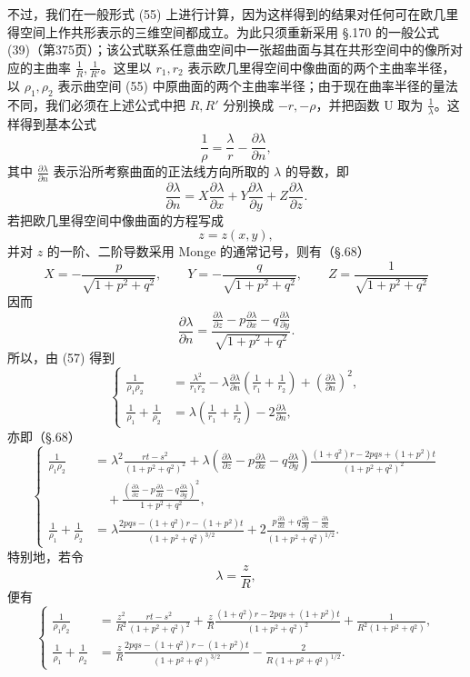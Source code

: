 不过，我们在一般形式 (55) 上进行计算，因为这样得到的结果对任何可在欧几里得空间上作共形表示的三维空间都成立。为此只须重新采用 \S.170 的一般公式 (39)（第375页）；该公式联系任意曲空间中一张超曲面与其在共形空间中的像所对应的主曲率 $\frac1R,\frac1{R'}$。这里以 $r_1,r_2$ 表示欧几里得空间中像曲面的两个主曲率半径，以 $\rho_1,\rho_2$ 表示曲空间 (55) 中原曲面的两个主曲率半径；由于现在曲率半径的量法不同，我们必须在上述公式中把 $R,R'$ 分别换成 $-r,-\rho$，并把函数 U 取为 $\frac1\lambda$。这样得到基本公式
\[
\tag{57}
\frac1\rho=\frac{\lambda}{r}-\frac{\partial\lambda}{\partial n},
\]
其中 $\frac{\partial\lambda}{\partial n}$ 表示沿所考察曲面的正法线方向所取的 $\lambda$ 的导数，即
\[
\frac{\partial\lambda}{\partial n}=X\frac{\partial\lambda}{\partial x}+Y\frac{\partial\lambda}{\partial y}+Z\frac{\partial\lambda}{\partial z}.
\]
若把欧几里得空间中像曲面的方程写成
\[
z=z(x,y),
\]
并对 $z$ 的一阶、二阶导数采用 Monge 的通常记号，则有（\S.68）
\[
X=-\frac{p}{\sqrt{1+p^2+q^2}},\qquad
Y=-\frac{q}{\sqrt{1+p^2+q^2}},\qquad
Z=\frac1{\sqrt{1+p^2+q^2}}
\]
因而
\[
\frac{\partial\lambda}{\partial n}=\frac{\frac{\partial\lambda}{\partial z}-p\frac{\partial\lambda}{\partial x}-q\frac{\partial\lambda}{\partial y}}{\sqrt{1+p^2+q^2}}.
\]
所以，由 (57) 得到
\[
\tag{57*}
\left\{
\begin{aligned}
\frac1{\rho_1\rho_2}&=\frac{\lambda^2}{r_1r_2}-\lambda\frac{\partial\lambda}{\partial n}\left(\frac1{r_1}+\frac1{r_2}\right)+\left(\frac{\partial\lambda}{\partial n}\right)^2,\\
\frac1{\rho_1}+\frac1{\rho_2}&=\lambda\left(\frac1{r_1}+\frac1{r_2}\right)-2\frac{\partial\lambda}{\partial n},
\end{aligned}\right.
\]
亦即（\S.68）
\[
\tag{58}
\left\{
\begin{aligned}
\frac1{\rho_1\rho_2}&=\lambda^2\frac{rt-s^2}{(1+p^2+q^2)^2}
+\lambda\left(\frac{\partial\lambda}{\partial z}-p\frac{\partial\lambda}{\partial x}-q\frac{\partial\lambda}{\partial y}\right)
\frac{(1+q^2)r-2pqs+(1+p^2)t}{(1+p^2+q^2)^2}\\
&\quad+\frac{\left(\frac{\partial\lambda}{\partial z}-p\frac{\partial\lambda}{\partial x}-q\frac{\partial\lambda}{\partial y}\right)^2}{1+p^2+q^2},\\
\frac1{\rho_1}+\frac1{\rho_2}&=\lambda\frac{2pqs-(1+q^2)r-(1+p^2)t}{(1+p^2+q^2)^{3/2}}
+2\frac{p\frac{\partial\lambda}{\partial x}+q\frac{\partial\lambda}{\partial y}-\frac{\partial\lambda}{\partial z}}{(1+p^2+q^2)^{1/2}}.
\end{aligned}\right.
\]
特别地，若令
\[
\lambda=\frac zR,
\]
便有
\[
\tag{59}
\left\{
\begin{aligned}
\frac1{\rho_1\rho_2}&=\frac{z^2}{R^2}\frac{rt-s^2}{(1+p^2+q^2)^2}
+\frac zR\frac{(1+q^2)r-2pqs+(1+p^2)t}{(1+p^2+q^2)^2}
+\frac1{R^2(1+p^2+q^2)},\\
\frac1{\rho_1}+\frac1{\rho_2}&=\frac zR\frac{2pqs-(1+q^2)r-(1+p^2)t}{(1+p^2+q^2)^{3/2}}
-\frac2{R(1+p^2+q^2)^{1/2}}.
\end{aligned}\right.
\]


